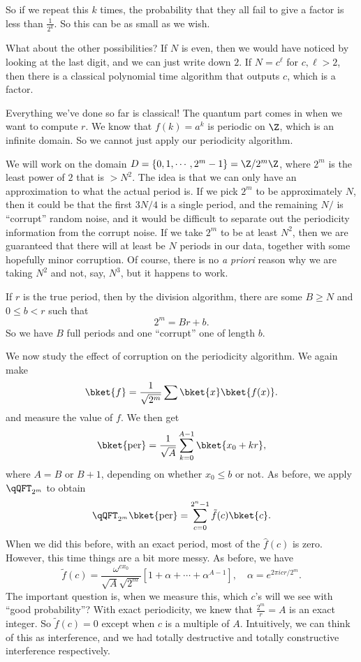 \documentclass[a4paper]{article}
\begin{document}
So if we repeat this $k$ times, the probability that they all fail to give a factor is less than $\frac{1}{2^k}$. So this can be as small as we wish.

What about the other possibilities? If $N$ is even, then we would have noticed by looking at the last digit, and we can just write down $2$. If $N = c^\ell$ for $c, \ell > 2$, then there is a classical polynomial time algorithm that outputs $c$, which is a factor.

Everything we've done so far is classical! The quantum part comes in when we want to compute $r$. We know that $f(k) = a^k$ is periodic on $\Z$, which is an infinite domain. So we cannot just apply our periodicity algorithm.

We will work on the domain $D = \{0, 1, \cdots, 2^m - 1\} = \Z/2^m \Z$, where $2^m$ is the least power of $2$ that is $>N^2$. The idea is that we can only have an approximation to what the actual period is. If we pick $2^m$ to be approximately $N$, then it could be that the first $3N/4$ is a single period, and the remaining $N/$ is ``corrupt'' random noise, and it would be difficult to separate out the periodicity information from the corrupt noise. If we take $2^m$ to be at least $N^2$, then we are guaranteed that there will at least be $N$ periods in our data, together with some hopefully minor corruption. Of course, there is no \emph{a priori} reason why we are taking $N^2$ and not, say, $N^3$, but it happens to work.

If $r$ is the true period, then by the division algorithm, there are some $B \geq N$ and $0 \leq b < r$ such that
\[
  2^m = Br + b.
\]
So we have $B$ full periods and one ``corrupt'' one of length $b$.

We now study the effect of corruption on the periodicity algorithm. We again make
\[
  \bket{f} = \frac{1}{\sqrt{2^m}} \sum \bket{x} \bket{f(x)}.
\]
and measure the value of $f$. We then get
\[
  \bket{\mathrm{per}} = \frac{1}{\sqrt{A}} \sum_{k = 0}^{A - 1} \bket{x_0 + kr},
\]
where $A = B$ or $B + 1$, depending on whether $x_0 \leq b$ or not. As before, we apply $\qQFT_{2^m}$ to obtain
\[
  \qQFT_{2^m}\bket{\mathrm{per}} = \sum_{c = 0}^{2^n - 1} \tilde{f}(c) \bket{c}.
\]
When we did this before, with an exact period, most of the $\hat{f}(c)$ is zero. However, this time things are a bit more messy. As before, we have
\[
  \tilde{f}(c) = \frac{\omega^{c x_0}}{\sqrt{A}\sqrt{2^m}} [1 + \alpha + \cdots + \alpha^{A - 1}],\quad \alpha = e^{2\pi i cr/2^m}.
\]
The important question is, when we measure this, which $c$'s will we see with ``good probability''? With exact periodicity, we knew that $\frac{2^m}{r} = A$ is an exact integer. So $\tilde{f}(c) = 0$ except when $c$ is a multiple of $A$. Intuitively, we can think of this as interference, and we had totally destructive and totally constructive interference respectively.
\end{document}
